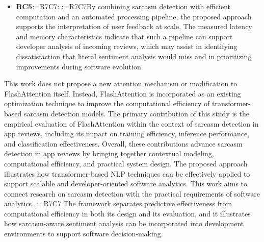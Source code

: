 \documentclass[a4paper,fleqn]{cas-sc}
\makeatletter
\newif\iftracked
\newcommand{\rv@setcolour}[1]{%
  \IfStrEq{#1}{R7C7}{\color{rvEdit}}{%
    \IfSubStr{#1}{R5}{\IfSubStr{#1}{R7}{\color{rvBoth}}{\color{rvFive}}}{\color{rvSeven}}}}
\newcommand{\rv@tag}[1]{\textsuperscript{\sffamily\bfseries\scriptsize[\StrSubstitute{#1}{,}{, }]}\,}
\newcommand{\rv@recordone}[1]{%
  \edef\rv@i{#1}%
  \ifcsdef{rv@n@\rv@i}{}{\csgdef{rv@n@\rv@i}{0}}%
  \csxdef{rv@n@\rv@i}{\the\numexpr\csuse{rv@n@\rv@i}+1\relax}%
  \begingroup\edef\@currentlabel{\rv@i}\label{rv:\rv@i:\csuse{rv@n@\rv@i}}\endgroup}
\newcommand{\rv@record}[1]{\@for\rv@id:=#1\do{\expandafter\rv@recordone\expandafter{\rv@id}}}
\DeclareRobustCommand{\rcdel}[2]{\rv@record{#1}\iftracked{\rv@setcolour{#1}\rv@tag{#1}\rv@strike{#2}}\else\unskip\fi}
\DeclareRobustCommand{\rcrep}[3]{\rv@record{#1}\iftracked{\rv@setcolour{#1}\rv@tag{#1}\rv@strike{#2} #3}\else#3\fi}
\DeclareRobustCommand{\rce}[1]{\rv@record{R7C7}\iftracked{\color{rvEdit}#1}\else#1\fi}
\makeatother
\begin{document}
\begin{itemize}
\item \textbf{RC5}\rce{:} \rcrep{R7C7}{We combining}{By combining} sarcasm detection with efficient computation and an automated processing pipeline, the proposed approach supports the interpretation of user feedback at scale. The measured latency and memory characteristics indicate that such a pipeline can support developer analysis of incoming reviews, which may assist in identifying dissatisfaction that literal sentiment analysis would miss and in prioritizing improvements during software evolution.
\end{itemize}

This work does not propose a new attention mechanism or modification to FlashAttention itself. Instead, FlashAttention is incorporated as an existing optimization technique to improve the computational efficiency of transformer-based sarcasm detection models. The primary contribution of this study is the empirical evaluation of FlashAttention within the context of sarcasm detection in app reviews, including its impact on training efficiency, inference performance, and classification effectiveness. Overall, these contributions advance sarcasm detection in app reviews by bringing together contextual modeling, computational efficiency, and practical system design. The proposed approach illustrates how transformer-based NLP techniques can be effectively applied to support scalable and developer-oriented software analytics. This work aims to connect research on sarcasm detection with the practical requirements of software analytics. \rcdel{R7C7}{We present a transformer-based framework for sarcasm identification, evaluated with an optimized attention implementation and extended into an automated, confidence-aware orchestration pipeline that integrates with cloud-based workflows.} The framework separates predictive effectiveness from computational efficiency in both its design and its evaluation, and it illustrates how sarcasm-aware sentiment analysis can be incorporated into development environments to support software decision-making.
\end{document}
